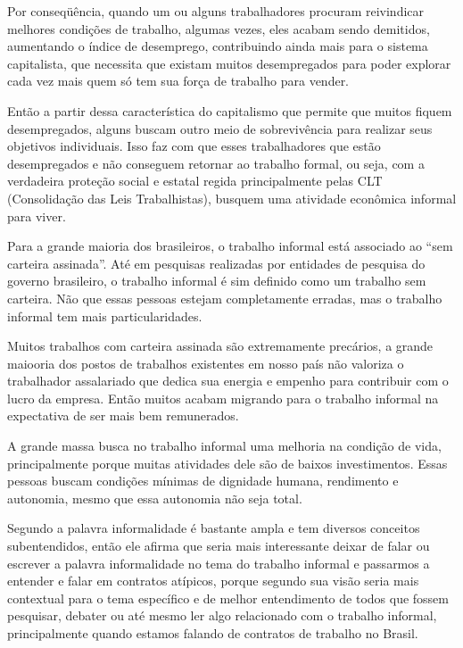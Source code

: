 
Por conseqüência, quando um ou alguns trabalhadores procuram reivindicar melhores condições de trabalho, algumas vezes, eles acabam sendo demitidos, aumentando o índice de desemprego, contribuindo ainda mais para o sistema capitalista, que necessita que existam muitos desempregados para poder explorar cada vez mais quem só tem sua força de trabalho para vender.

Então a partir dessa característica do capitalismo que permite que muitos fiquem desempregados, alguns buscam outro meio de sobrevivência para realizar seus objetivos individuais. Isso faz com que esses trabalhadores que estão desempregados e não conseguem retornar ao trabalho formal, ou seja, com a verdadeira proteção social e estatal regida principalmente pelas CLT (Consolidação das Leis Trabalhistas), busquem uma atividade econômica informal para viver. 

Para a grande maioria dos brasileiros, o trabalho informal está associado ao ``sem carteira assinada''. Até em pesquisas realizadas por entidades de pesquisa do governo brasileiro, o trabalho informal é sim definido como um trabalho sem carteira. Não que essas pessoas estejam completamente erradas, mas o trabalho informal tem mais particularidades.

Muitos trabalhos com carteira assinada são extremamente precários, a grande maiooria dos postos de trabalhos existentes em nosso país não valoriza o trabalhador assalariado que dedica sua energia e empenho para contribuir com o lucro da empresa. Então muitos acabam migrando para o trabalho informal na expectativa de ser mais bem remunerados.

A grande massa busca no trabalho informal uma melhoria na condição de vida, principalmente porque muitas atividades dele são de baixos investimentos. Essas pessoas buscam condições mínimas de dignidade humana, rendimento e autonomia, mesmo que essa autonomia não seja total.

Segundo \cite{noronha2003informal} a palavra informalidade é bastante ampla e tem diversos conceitos subentendidos, então ele afirma que seria mais interessante deixar de falar ou escrever a palavra informalidade no tema do trabalho informal e passarmos a entender e falar em contratos atípicos, porque segundo sua visão seria mais contextual para o tema específico e de melhor entendimento de todos que fossem pesquisar, debater ou até mesmo ler algo relacionado com o trabalho informal, principalmente quando estamos falando de contratos de trabalho no Brasil.

